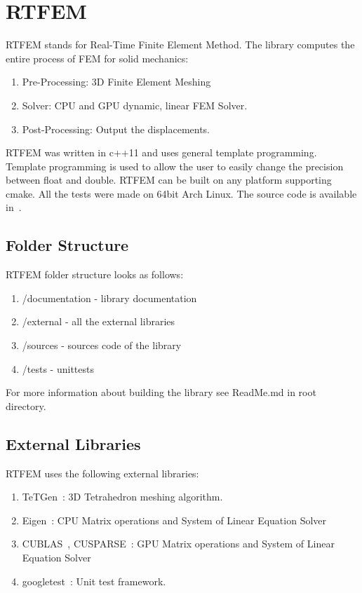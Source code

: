 \documentclass[en]{minipw} %
\begin{document}
\section{RTFEM}
RTFEM stands for Real-Time Finite Element Method. The library computes the entire process of FEM for solid mechanics:
\begin{enumerate}
\item Pre-Processing: 3D Finite Element Meshing
\item Solver: CPU and GPU dynamic, linear FEM Solver.
\item Post-Processing: Output the displacements.
\end{enumerate}

RTFEM was written in c++11 and uses general template programming. Template programming is used to allow the user to easily change the precision between float and double. RTFEM can be built on any platform supporting cmake. All the tests were made on 64bit Arch Linux. The source code is available in~\cite{rtfem}.

\subsection{Folder Structure}
RTFEM folder structure looks as follows:
\begin{enumerate}
\item /documentation - library documentation
\item /external - all the external libraries
\item /sources - sources code of the library
\item /tests - unittests
\end{enumerate}
For more information about building the library see ReadMe.md in root directory.

\subsection{External Libraries}
RTFEM uses the following external libraries:
\begin{enumerate}
\item TeTGen~\cite{tetgen}: 3D Tetrahedron meshing algorithm.
\item Eigen~\cite{eigen}: CPU Matrix operations and System of Linear Equation Solver
\item CUBLAS~\cite{cublas}, CUSPARSE~\cite{cusparse}: GPU Matrix operations and System of Linear Equation Solver
\item googletest~\cite{googletest}: Unit test framework.
\end{enumerate}
\end{document}
